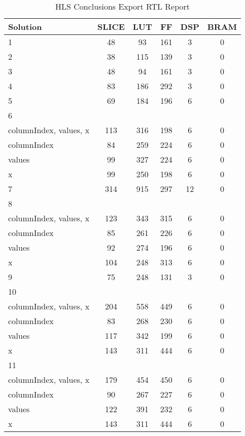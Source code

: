 \begin{table}[H]
	\centering
	\begin{tabular}{|l|c|c|c|c|c|}
		\hline
		\textbf{Solution} & \textbf{SLICE} & \textbf{LUT} & \textbf{FF} & \textbf{DSP} & \textbf{BRAM} \\
		\hline
		1 & 48 & 93 & 161 & 3 & 0 \\
		\hline
		2 & 38 & 115 & 139 & 3 & 0 \\
		\hline
		3 & 48 & 94 & 161 & 3 & 0 \\
		\hline
		4 & 83 & 186 & 292 & 3 & 0 \\
		\hline
		5 & 69 & 184 & 196 & 6 & 0 \\
		\hline
		6 &  &  &  &  & \\
		\tabitem columnIndex, values, x & 113 & 316 & 198 & 6 & 0 \\
		\tabitem columnIndex & 84 & 259 & 224 & 6 & 0 \\
		\tabitem values & 99 & 327 & 224 & 6 & 0 \\
		\tabitem x & 99 & 250 & 198 & 6 & 0 \\
		\hline
		7 & 314 & 915 & 297 & 12 & 0 \\
		\hline
		8 &  &  &  &  &  \\
		\tabitem columnIndex, values, x & 123 & 343 & 315 & 6 & 0 \\
		\tabitem columnIndex & 85 & 261 & 226 & 6 & 0 \\
		\tabitem values & 92 & 274 & 196 & 6 & 0 \\
		\tabitem x & 104 & 248 & 313 & 6 & 0 \\
		\hline
		9 & 75 & 248 & 131 & 3 & 0 \\
		\hline
		10 &  &  &  &  &  \\
		\tabitem columnIndex, values, x & 204 & 558 & 449 & 6 & 0 \\
		\tabitem columnIndex & 83 & 268 & 230 & 6 & 0 \\
		\tabitem values & 117 & 342 & 199 & 6 & 0 \\
		\tabitem x & 143 & 311 & 444 & 6 & 0 \\
		\hline
		11 &  &  &  &  &  \\
		\tabitem columnIndex, values, x & 179 & 454 & 450 & 6 & 0 \\
		\tabitem columnIndex & 90 & 267 & 227 & 6 & 0 \\
		\tabitem values & 122 & 391 & 232 & 6 & 0 \\
		\tabitem x & 143 & 311 & 444 & 6 & 0 \\
		\hline
	\end{tabular}
	\caption{HLS Conclusions Export RTL Report}
	\label{tab:hls-conclusions-export-rtl-report}
\end{table}

